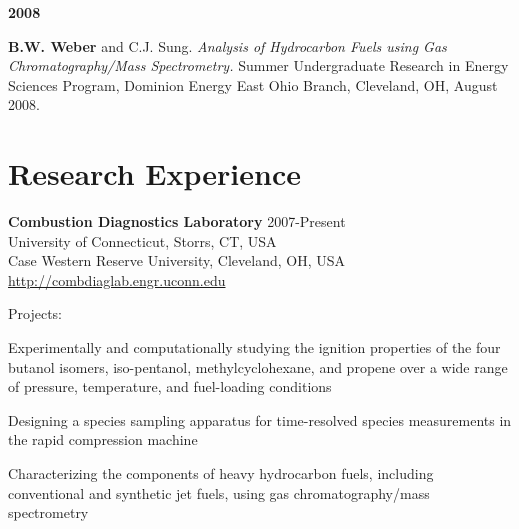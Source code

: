 \begin{bibsection}
\item[] \textbf{2008}
\item[] \textbf{ B.W. Weber} and C.J. Sung. \textit{Analysis of
        Hydrocarbon Fuels using Gas Chromatography/Mass Spectrometry.}
        Summer Undergraduate Research in Energy Sciences Program,
        Dominion Energy East Ohio Branch, Cleveland, OH, August 2008.
\end{bibsection}

\vspace{0.1in}

\section{Research Experience}

\textbf{\large Combustion Diagnostics Laboratory} \hfill 2007-Present\\
University of Connecticut, Storrs, CT, USA\\
Case Western Reserve University, Cleveland, OH, USA\\
\href{http://combdiaglab.engr.uconn.edu}{http://combdiaglab.engr.uconn.edu}
\begin{outerlist}
\item[] Projects:
   \begin{innerlist}
   \item Experimentally and computationally studying the ignition
         properties of the four butanol isomers, iso-pentanol,
         methylcyclohexane, and propene over a wide range of pressure,
         temperature, and fuel-loading conditions
   \item Designing a species sampling apparatus for time-resolved
         species measurements in the rapid compression machine
   \item Characterizing the components of heavy hydrocarbon fuels,
         including conventional and synthetic jet fuels, using gas
         chromatography/mass spectrometry
   \end{innerlist}

\end{outerlist}

